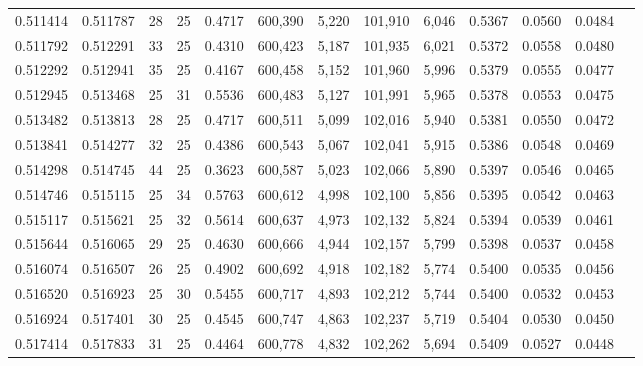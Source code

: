 \begin{tabular}{rrrrrrrrrrrrr}
0.511414 & 0.511787 &    28 &  25 &                                     0.4717 & 600,390 &   5,220 & 101,910 &   6,046 & 0.5367 & 0.0560 & 0.0484 \\
0.511792 & 0.512291 &    33 &  25 &                                     0.4310 & 600,423 &   5,187 & 101,935 &   6,021 & 0.5372 & 0.0558 & 0.0480 \\
0.512292 & 0.512941 &    35 &  25 &                                     0.4167 & 600,458 &   5,152 & 101,960 &   5,996 & 0.5379 & 0.0555 & 0.0477 \\
0.512945 & 0.513468 &    25 &  31 &                                     0.5536 & 600,483 &   5,127 & 101,991 &   5,965 & 0.5378 & 0.0553 & 0.0475 \\
0.513482 & 0.513813 &    28 &  25 &                                     0.4717 & 600,511 &   5,099 & 102,016 &   5,940 & 0.5381 & 0.0550 & 0.0472 \\
0.513841 & 0.514277 &    32 &  25 &                                     0.4386 & 600,543 &   5,067 & 102,041 &   5,915 & 0.5386 & 0.0548 & 0.0469 \\
0.514298 & 0.514745 &    44 &  25 &                                     0.3623 & 600,587 &   5,023 & 102,066 &   5,890 & 0.5397 & 0.0546 & 0.0465 \\
0.514746 & 0.515115 &    25 &  34 &                                     0.5763 & 600,612 &   4,998 & 102,100 &   5,856 & 0.5395 & 0.0542 & 0.0463 \\
0.515117 & 0.515621 &    25 &  32 &                                     0.5614 & 600,637 &   4,973 & 102,132 &   5,824 & 0.5394 & 0.0539 & 0.0461 \\
0.515644 & 0.516065 &    29 &  25 &                                     0.4630 & 600,666 &   4,944 & 102,157 &   5,799 & 0.5398 & 0.0537 & 0.0458 \\
0.516074 & 0.516507 &    26 &  25 &                                     0.4902 & 600,692 &   4,918 & 102,182 &   5,774 & 0.5400 & 0.0535 & 0.0456 \\
0.516520 & 0.516923 &    25 &  30 &                                     0.5455 & 600,717 &   4,893 & 102,212 &   5,744 & 0.5400 & 0.0532 & 0.0453 \\
0.516924 & 0.517401 &    30 &  25 &                                     0.4545 & 600,747 &   4,863 & 102,237 &   5,719 & 0.5404 & 0.0530 & 0.0450 \\
0.517414 & 0.517833 &    31 &  25 &                                     0.4464 & 600,778 &   4,832 & 102,262 &   5,694 & 0.5409 & 0.0527 & 0.0448 \\

\end{tabular}

